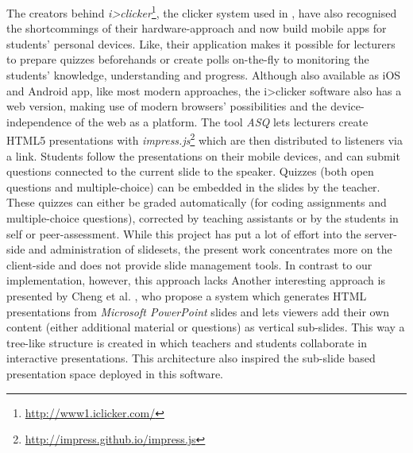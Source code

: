 The creators behind \emph{i>clicker}\footnote{\url{http://www1.iclicker.com/}}, the clicker system used in \cite{Chamillard:StudentResponseSystem}, have also recognised the shortcommings of their hardware-approach and now build mobile apps for students' personal devices. Like\cite{Esponda:ElectronicVotingOnTheFly}, their application makes it possible for lecturers to prepare quizzes beforehands or create polls on-the-fly to monitoring the students' knowledge, understanding and progress. Although also available as iOS and Android app, like most modern approaches, the i>clicker software also has a web version, making use of modern browsers' possibilities and the device-independence of the web as a platform.
The tool \emph{ASQ} \cite{Triglianos:InteractiveWebPresentationsImpress} lets lecturers create HTML5 presentations with \emph{impress.js}\footnote{\url{http://impress.github.io/impress.js}} which are then distributed to listeners via a link. Students follow the presentations on their mobile devices, and can submit questions connected to the current slide to the speaker. Quizzes (both open questions and multiple-choice) can be embedded in the slides by the teacher. These quizzes can either be graded automatically (for coding assignments and multiple-choice questions), corrected by teaching assistants or by the students in self or peer-assessment. While this project has put a lot of effort into the server-side and administration of slidesets, the present work concentrates more on the client-side and does not provide slide management tools. In contrast to our implementation, however, this approach lacks 
Another interesting approach is presented by Cheng et al. \cite{Cheng:TreebasedOnlinePresentations}, who propose a system which generates HTML presentations from \emph{Microsoft PowerPoint} slides and lets viewers add their own content (either additional material or questions) as vertical sub-slides. This way a tree-like structure is created in which teachers and students collaborate in interactive presentations. This architecture also inspired the sub-slide based presentation space deployed in this software.


